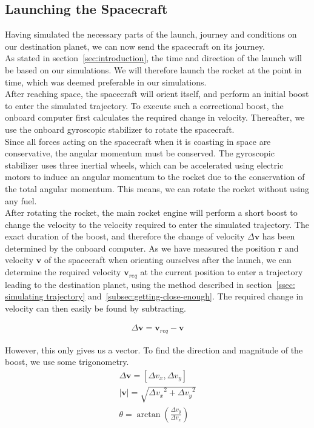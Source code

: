 \documentclass[reprint,english,notitlepage]{revtex4-2}
\begin{document}
\subsection{Launching the Spacecraft}\label{subsec:launching-the-spacecraft}
    Having simulated the necessary parts of the launch, journey and conditions on our destination planet, we can now send the spacecraft on its journey.\\
    As stated in section~\ref{sec:introduction}, the time and direction of the launch will be based on our simulations.
    We will therefore launch the rocket at the point in time, which was deemed preferable in our simulations.\\

    After reaching space, the spacecraft will orient itself, and perform an initial boost to enter the simulated trajectory.
    To execute such a correctional boost, the onboard computer first calculates the required change in velocity.
    Thereafter, we use the onboard gyroscopic stabilizer to rotate the spacecraft.\\
    Since all forces acting on the spacecraft when it is coasting in space are conservative, the angular momentum must be conserved.
    The gyroscopic stabilizer uses three inertial wheels, which can be accelerated using electric motors to induce an angular momentum to the rocket due to the conservation of the total angular momentum.
    This means, we can rotate the rocket without using any fuel.\\
    After rotating the rocket, the main rocket engine will perform a short boost to change the velocity to the velocity required to enter the simulated trajectory.
    The exact duration of the boost, and therefore the change of velocity $\Delta \textbf{v}$ has been determined by the onboard computer.
    As we have measured the position $ \textbf{r}$ and velocity $\textbf{v}$ of the spacecraft when orienting ourselves after the launch, we can determine the required velocity $ \textbf{v}_{req}$ at the current position to enter a trajectory leading to the destination planet, using the method described in section~\ref{ssec: simulating trajectory} and~\ref{subsec:getting-close-enough}.
    The required change in velocity can then easily be found by subtracting.

    \begin{align}
        \Delta\textbf{v} = \textbf{v}_{req} - \textbf{v} \label{boost_calc_1}
    \end{align}

    However, this only gives us a vector.
    To find the direction and magnitude of the boost, we use some trigonometry.
    \begin{align} \label{boost_calc2}
        \Delta\textbf{v} = [\Delta v_x, \Delta v_y]\\
        |\textbf{v}| = \sqrt{{\Delta v_x}^2 + {\Delta v_y}^2}\\
        \theta = \arctan \left(\frac{\Delta v_y}{\Delta v_x}\right)
    \end{align}
\end{document}
